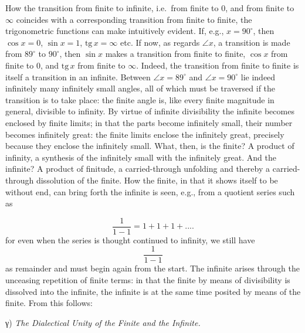 \documentclass[12pt,a4paper,openany]{book}
\newcommand{\opage}[1]{\marginnote{\footnotesize\textit{[#1]}}}
\begin{document}
How the transition from finite to infinite, i.e.\
from finite to $0$, and from finite to $\infty$ coincides
with a corresponding transition from finite to finite,
the trigonometric functions can make intuitively evident. If, e.g., $x=90^{\circ}$, then $\cos x=0$, $\sin x=1$, $\mathrm{tg}\,x=\infty$ etc.
If now, as regards $\angle x$, a transition is made from $89^{\circ}$ to $90^{\circ}$, then $\sin x$ makes a transition from finite to finite, $\cos x$ from finite to $0$, and $\mathrm{tg}\,x$ from finite to $\infty$. Indeed,
the transition from finite to finite is itself a transition in
an infinite. Between $\angle x=89^{\circ}$ and $\angle x=90^{\circ}$ lie
indeed infinitely many infinitely small angles, all of which must
be traversed if the transition is to take place: the finite angle
is, like every finite magnitude in general, divisible to
infinity. By virtue of infinite divisibility the
\setcounter{footnote}{0}%
\opage{32}infinite becomes enclosed by finite limits; in that the parts become
infinitely small, their number becomes infinitely great: the finite
limits enclose the infinitely great, precisely because they
enclose the infinitely small. What, then, is the finite?
A product of infinity, a synthesis of the infinitely
small with the infinitely great. And the infinite? A
product of finitude, a carried-through unfolding and thereby
a carried-through dissolution of the finite. How
the finite, in that it shows itself to be without end, can
bring forth the infinite is seen, e.g., from a quotient series such as

\[ \frac{1}{1-1}=1+1+1+.... \]
for even when the series
is thought continued to infinity, we still have
\[ \frac{1}{1-1} \]
as remainder
and must begin again from the start. The infinite arises through
the unceasing repetition of finite terms: in that the finite by means of
divisibility is dissolved into the infinite, the
infinite is at the same time posited by means of the finite.
From this follows:
\begin{center}γ) \emph{The Dialectical Unity of the Finite and the Infinite.}\end{center}
\end{document}
